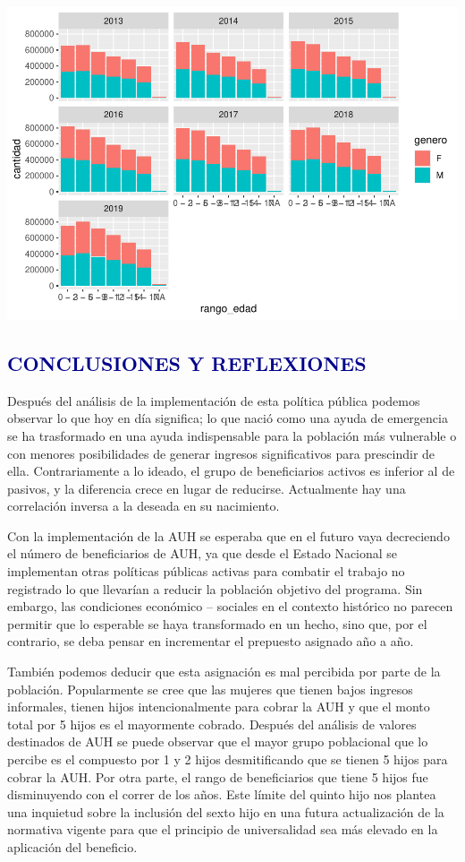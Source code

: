 \documentclass[
  12,
]{article}
\begin{document}
\includegraphics{Grupo4_Final_files/figure-latex/grafico_prestaciones_sexo_edad_ninies-1.pdf}

\hypertarget{conclusiones-y-reflexiones}{%
\subsection{\texorpdfstring{\textcolor{darkblue}{CONCLUSIONES Y
REFLEXIONES}}{CONCLUSIONES Y REFLEXIONES}}\label{conclusiones-y-reflexiones}}

Después del análisis de la implementación de esta política pública
podemos observar lo que hoy en día significa; lo que nació como una
ayuda de emergencia se ha trasformado en una ayuda indispensable para la
población más vulnerable o con menores posibilidades de generar ingresos
significativos para prescindir de ella. Contrariamente a lo ideado, el
grupo de beneficiarios activos es inferior al de pasivos, y la
diferencia crece en lugar de reducirse. Actualmente hay una correlación
inversa a la deseada en su nacimiento.

Con la implementación de la AUH se esperaba que en el futuro vaya
decreciendo el número de beneficiarios de AUH, ya que desde el Estado
Nacional se implementan otras políticas públicas activas para combatir
el trabajo no registrado lo que llevarían a reducir la población
objetivo del programa. Sin embargo, las condiciones económico --
sociales en el contexto histórico no parecen permitir que lo esperable
se haya transformado en un hecho, sino que, por el contrario, se deba
pensar en incrementar el prepuesto asignado año a año.

También podemos deducir que esta asignación es mal percibida por parte
de la población. Popularmente se cree que las mujeres que tienen bajos
ingresos informales, tienen hijos intencionalmente para cobrar la AUH y
que el monto total por 5 hijos es el mayormente cobrado. Después del
análisis de valores destinados de AUH se puede observar que el mayor
grupo poblacional que lo percibe es el compuesto por 1 y 2 hijos
desmitificando que se tienen 5 hijos para cobrar la AUH. Por otra parte,
el rango de beneficiarios que tiene 5 hijos fue disminuyendo con el
correr de los años. Este límite del quinto hijo nos plantea una
inquietud sobre la inclusión del sexto hijo en una futura actualización
de la normativa vigente para que el principio de universalidad sea más
elevado en la aplicación del beneficio.
\end{document}
